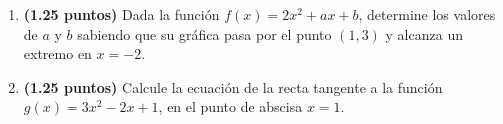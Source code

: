 
\begin{enumerate}[label=\alph*)]
\item \textbf{(1.25 puntos)} Dada la función $f(x)=2x^2+ax+b$, determine los valores de $a$ y $b$ sabiendo que su gráfica pasa por el punto $(1,3)$ y alcanza un extremo en $x=-2$.
\item \textbf{(1.25 puntos)} Calcule la ecuación de la recta tangente a la función $g(x)=3x^2-2x+1$, en el punto de abscisa $x=1$.
\end{enumerate}
